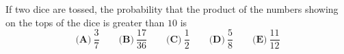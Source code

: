 If two dice are tossed, the probability that the product of the numbers showing on the tops of the dice is greater than $10$ is
\[
\textbf{(A)}\ \dfrac{3}{7}\qquad\textbf{(B)}\ \dfrac{17}{36}\qquad\textbf{(C)}\ \dfrac{1}{2}\qquad\textbf{(D)}\ \dfrac{5}{8}\qquad\textbf{(E)}\ \dfrac{11}{12}
\]
